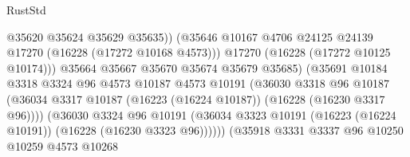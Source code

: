 \begin{lexlean}{RustStd}
\begin{coremodule}
                                            @35620
                                            @35624
                                            @35629
                                            @35635))
                                        (@35646
                                          @10167
                                          @4706
                                          @24125
                                          @24139
                                          @17270
                                          (@16228 (@17272 @10168 @4573)))
                                        @17270
                                        (@16228 (@17272 @10125 @10174)))
                                      @35664
                                      @35667
                                      @35670
                                      @35674
                                      @35679
                                      @35685)
                                    (@35691
                                      @10184
                                      @3318
                                      @3324
                                      @96
                                      @4573
                                      @10187
                                      @4573
                                      @10191
                                      (@36030
                                        @3318
                                        @96
                                        @10187
                                        (@36034
                                          @3317
                                          @10187
                                          (@16223 (@16224 @10187))
                                          (@16228 (@16230 @3317 @96))))
                                      (@36030
                                        @3324
                                        @96
                                        @10191
                                        (@36034
                                          @3323
                                          @10191
                                          (@16223 (@16224 @10191))
                                          (@16228 (@16230 @3323 @96))))))
                                  (@35918
                                    @3331
                                    @3337
                                    @96
                                    @10250
                                    @10259
                                    @4573
                                    @10268

\end{coremodule}
\end{lexlean}
